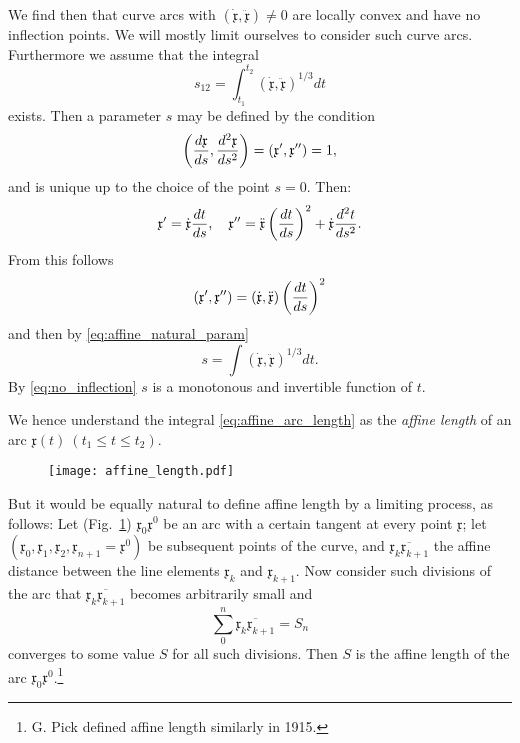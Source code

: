 \documentclass[11pt]{book} \usepackage{amssymb}
\newcommand{\myvec}[1]{\mathfrak{#1}}
\newcommand{\vecx}{\myvec{x}}
\newcommand{\vecderiv}[1]{\dot{\myvec{#1}}}
\newcommand{\vecderivv}[1]{\ddot{\myvec{#1}}}
\begin{document}
We find then that curve arcs with $(\vecderiv{x},\vecderivv{x})\neq 0$ are 
locally convex and have no inflection points. We will mostly limit ourselves
to consider such curve arcs. Furthermore we assume that the integral
\begin{equation}
  \label{eq:affine_arc_length}
  s_{12}=\int_{t_1}^{t_2}(\vecderiv{x},\vecderivv{x})^{1/3}dt
\end{equation}
exists. Then a parameter $s$ may be defined by the condition
\begin{equation}
  \label{eq:affine_natural_param}
  \left({d\vecx\over ds},{d^2\vecx\over ds^2}\right)=
  (\vecx',\vecx'')=1,
\end{equation}
and is unique up to the choice of the point $s=0$. Then:
\begin{equation}
  \label{eq:param_transform}
  \vecx'=\vecderiv{x}{dt\over ds},\quad 
  \vecx''=\vecderivv{x}\left({dt\over ds}\right)^2+\vecderiv{x}{d^2t\over ds^2}.
\end{equation}
From this follows
\begin{equation}
  \label{eq:affine_deriv_transform1}
  (\vecx',\vecx'')=(\vecderiv{x},\vecderivv{x})\left({}dt\over ds\right)^2
\end{equation}
and then by \eqref{eq:affine_natural_param}
\begin{equation}
  \label{eq:affine_arc_length2}
  s=\int(\vecderiv{x},\vecderivv{x})^{1/3}dt.
\end{equation}
By \eqref{eq:no_inflection} $s$ is a monotonous and invertible function of $t$.

We hence understand the integral \eqref{eq:affine_arc_length} as the 
{\em affine length} of an arc $\vecx(t)\:(t_1\leq t \leq t_2)$.

\begin{figure}[htp]
  \centering
  \texttt{[image: affine\_length.pdf]}
  \caption{}
  \label{fig:affine_length}
\end{figure}

But it would be equally natural to define affine length by a limiting process, 
as follows: Let (Fig.~\ref{fig:affine_length}) $\vecx_0\vecx^0$ be an
arc with a certain tangent at every point $\vecx$; let 
$(\vecx_0,\vecx_1,\vecx_2,\vecx_{n+1}=\vecx^0)$ be subsequent points of the
curve, and $\overline{\vecx_k\vecx_{k+1}}$ the affine distance between the line
elements $\vecx_k$ and $\vecx_{k+1}$. Now consider such divisions of the arc 
that $\overline{\vecx_k\vecx_{k+1}}$ becomes arbitrarily small and
\begin{equation}
  \label{eq:affine_length_limit}
  \sum_0^n\overline{\vecx_k\vecx_{k+1}}=S_n
\end{equation}
converges to some value $S$ for all such divisions. Then $S$ is the affine 
length of the 
arc $\vecx_0\vecx^0$.\footnote{G. Pick defined affine length similarly in 1915.}
\end{document}
